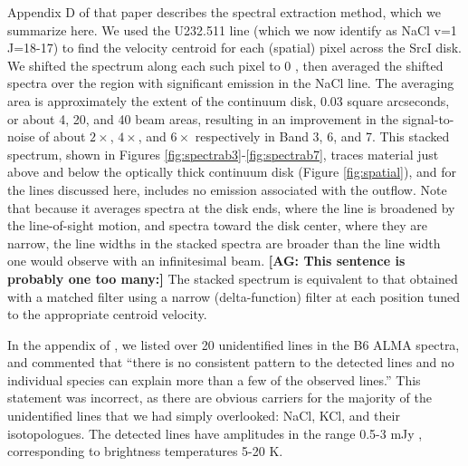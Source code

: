 \documentclass[twocolumn]{aastex62}
\newcommand{\sourcei}{SrcI\xspace}
\newcommand{\ag}[1]{\textcolor{red!65!black}{\textbf{[AG: #1]}}}
\begin{document}
Appendix D of that paper describes the spectral extraction method,
which we summarize here.  We used the U232.511 line (which we now identify as
NaCl v=1 J=18-17) to find the velocity centroid for each (spatial) pixel
across the \sourcei disk.  We shifted the spectrum along
each such pixel to 0 \kms, then averaged the shifted spectra over the region with
significant emission in the NaCl line.  
The
averaging area is approximately the extent of the continuum disk, 0.03 square
arcseconds, or about 4, 20, and 40  beam areas, resulting
in an improvement in the signal-to-noise of about $2\times$, $4\times$, and $6\times$
respectively in Band 3, 6, and 7.
This stacked spectrum, shown in Figures \ref{fig:spectrab3}-\ref{fig:spectrab7},
traces material just above and below the optically thick continuum disk
(Figure \ref{fig:spatial}), and for the lines discussed here, includes no
emission associated with the outflow.  Note that because it averages spectra
at the disk ends, where the line is broadened by the line-of-sight motion,
and spectra toward the disk center, where they are narrow, the line widths
in the stacked spectra are broader than the line width one would observe
with an infinitesimal beam.  \ag{This sentence is probably one too many:} The stacked spectrum is equivalent to that
obtained with a matched filter using a narrow (delta-function) filter at each
position tuned to the appropriate centroid velocity.



In the appendix of \citet{Ginsburg2018b}, we listed over 20 unidentified 
lines in the B6 ALMA spectra, and commented that ``there is no
consistent pattern to the detected lines and no individual species can explain
more than a few of the observed lines.''  This statement was incorrect, as
there are obvious carriers for the majority of the unidentified lines that we
had simply overlooked: NaCl, KCl, and their isotopologues.  The
detected lines have amplitudes in the range 0.5-3 mJy \perbeam, corresponding
to brightness temperatures 5-20 K.  
\end{document}
